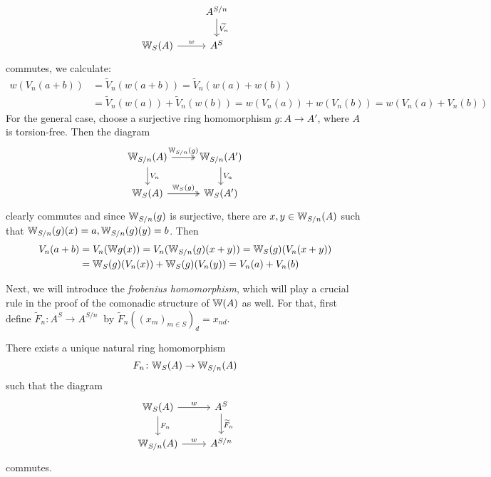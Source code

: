 \begin{bigproof}
\[\begin{tikzcd}
            & A^{S/n} \arrow[d,"\widetilde{V_n}"]\\
            \W_S(A) \arrow[r,"w"]
            & A^S
        \end{tikzcd}
    \]
    commutes, we calculate:
    \begin{align*}
        w(V_n(a+b)) &= \widetilde{V}_n(w(a+b))= \widetilde{V}_n(w(a)+w(b)) \\
        &= \widetilde{V}_n(w(a))+\widetilde{V}_n(w(b))
        = w(V_n(a))+w(V_n(b))= w(V_n(a)+V_n(b))
    \end{align*}
    For the general case, choose a surjective ring homomorphism $g \colon A \to A'$,
    where $A$ is torsion-free. Then the diagram
    \[
       \begin{tikzcd}
           \W_{S/n}(A) \arrow[r,"\W_{S/n}(g)",twoheadrightarrow] \arrow[d,"V_n"] 
             & \W_{S/n}(A') \arrow[d,"V_n"] \\
           \W_S(A) \arrow[r,"\W_S(g)",twoheadrightarrow]
             & \W_S(A')
       \end{tikzcd} 
    \]
    clearly commutes and since $\mathbb{W}_{S/n}(g)$ is surjective, there are $x,y \in \mathbb{W}_{S/n}(A)$
    such that $\mathbb{W}_{S/n}(g)(x)=a, \mathbb{W}_{S/n}(g)(y)=b$.
    Then 
    \begin{align*}
        V_n(a+b) &= V_n(\mathbb{W} g(x))= V_n(\mathbb{W}_{S/n}(g)(x+y))=\mathbb{W}_S(g)(V_n(x+y)) \\
        &= \mathbb{W}_S(g)(V_n(x)) + \mathbb{W}_S(g)(V_n(y)) = V_n(a)+V_n(b)
    \end{align*}
\end{bigproof}
Next, we will introduce the \textit{frobenius homomorphism}, which will play 
a crucial rule in the proof of the comonadic structure of $\mathbb{W}(A)$ as well.
For that, first define $\widetilde{F}_n \colon A^S \to A^{S/n} \ $
by $\widetilde{F}_n((x_m)_{m \in S})_d = x_{nd}$.
\begin{lemma} \label{lem: frobenius}
    There exists a unique natural ring homomorphism
    \[
      F_n \colon \mathbb{W}_S(A) \to \mathbb{W}_{S/n}(A)  
    \]
    such that the diagram 
    \[
        \begin{tikzcd}
            \W_S(A) \arrow[r,"w"] \arrow[d,"F_n"] 
              & A^S \arrow[d,"\widetilde{F}_n"] \\
            \W_{S/n}(A) \arrow[r,"w"]
              & A^{S/n}
        \end{tikzcd}        
    \]
    commutes.
\end{lemma}

